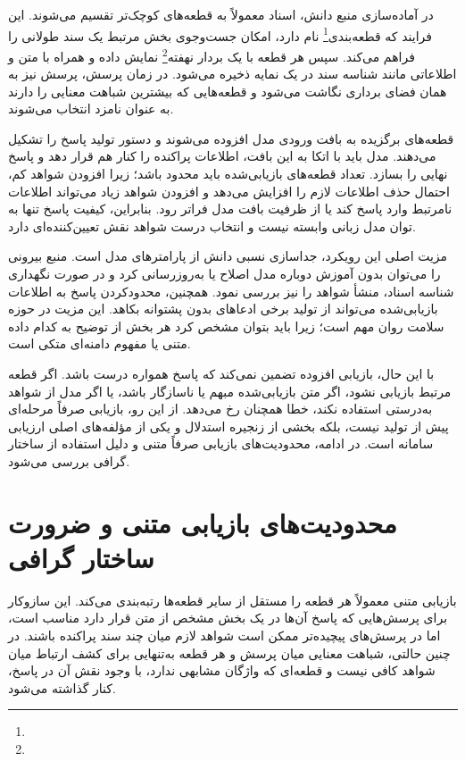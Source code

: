 در آماده‌سازی منبع دانش، اسناد معمولاً به قطعه‌های کوچک‌تر تقسیم می‌شوند. این فرایند که قطعه‌بندی\footnote{} نام دارد، امکان جست‌وجوی بخش مرتبط یک سند طولانی را فراهم می‌کند. سپس هر قطعه با یک بردار نهفته\footnote{} نمایش داده و همراه با متن و اطلاعاتی مانند شناسه سند در یک نمایه ذخیره می‌شود. در زمان پرسش، پرسش نیز به همان فضای برداری نگاشت می‌شود و قطعه‌هایی که بیشترین شباهت معنایی را دارند به عنوان نامزد انتخاب می‌شوند.

قطعه‌های برگزیده به بافت ورودی مدل افزوده می‌شوند و دستور تولید پاسخ را تشکیل می‌دهند. مدل باید با اتکا به این بافت، اطلاعات پراکنده را کنار هم قرار دهد و پاسخ نهایی را بسازد. تعداد قطعه‌های بازیابی‌شده باید محدود باشد؛ زیرا افزودن شواهد کم، احتمال حذف اطلاعات لازم را افزایش می‌دهد و افزودن شواهد زیاد می‌تواند اطلاعات نامرتبط وارد پاسخ کند یا از ظرفیت بافت مدل فراتر رود. بنابراین، کیفیت پاسخ تنها به توان مدل زبانی وابسته نیست و انتخاب درست شواهد نقش تعیین‌کننده‌ای دارد.

مزیت اصلی این رویکرد، جداسازی نسبی دانش از پارامترهای مدل است. منبع بیرونی را می‌توان بدون آموزش دوباره مدل اصلاح یا به‌روزرسانی کرد و در صورت نگهداری شناسه اسناد، منشأ شواهد را نیز بررسی نمود. همچنین، محدودکردن پاسخ به اطلاعات بازیابی‌شده می‌تواند از تولید برخی ادعاهای بدون پشتوانه بکاهد. این مزیت در حوزه سلامت روان مهم است؛ زیرا باید بتوان مشخص کرد هر بخش از توضیح به کدام داده متنی یا مفهوم دامنه‌ای متکی است.

با این حال، بازیابی افزوده تضمین نمی‌کند که پاسخ همواره درست باشد. اگر قطعه مرتبط بازیابی نشود، اگر متن بازیابی‌شده مبهم یا ناسازگار باشد، یا اگر مدل از شواهد به‌درستی استفاده نکند، خطا همچنان رخ می‌دهد. از این رو، بازیابی صرفاً مرحله‌ای پیش از تولید نیست، بلکه بخشی از زنجیره استدلال و یکی از مؤلفه‌های اصلی ارزیابی سامانه است. در ادامه، محدودیت‌های بازیابی صرفاً متنی و دلیل استفاده از ساختار گرافی بررسی می‌شود.

\section{محدودیت‌های بازیابی متنی و ضرورت ساختار گرافی}

بازیابی متنی معمولاً هر قطعه را مستقل از سایر قطعه‌ها رتبه‌بندی می‌کند. این سازوکار برای پرسش‌هایی که پاسخ آن‌ها در یک بخش مشخص از متن قرار دارد مناسب است، اما در پرسش‌های پیچیده‌تر ممکن است شواهد لازم میان چند سند پراکنده باشند. در چنین حالتی، شباهت معنایی میان پرسش و هر قطعه به‌تنهایی برای کشف ارتباط میان شواهد کافی نیست و قطعه‌ای که واژگان مشابهی ندارد، با وجود نقش آن در پاسخ، کنار گذاشته می‌شود.

